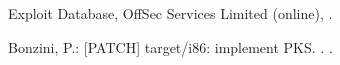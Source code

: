 \documentclass[english,sigrecommended,JIP]{ipsj}
\begin{document}
\begin{thebibliography}{99}



Exploit Database, OffSec Services Limited (online),
 .

  
    Bonzini, P.: [PATCH] target/i86: implement PKS. . .


\end{thebibliography}
\end{document}
